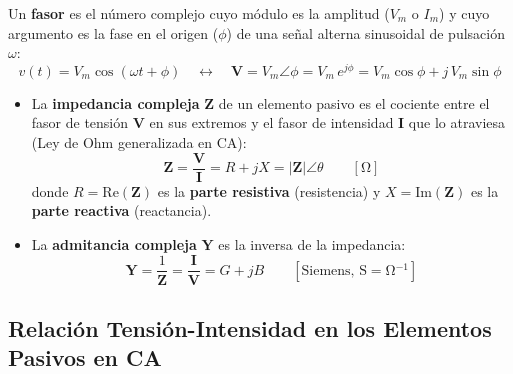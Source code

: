 Un \textbf{fasor} es el número complejo cuyo módulo es la amplitud ($V_m$ o $I_m$) y cuyo argumento es la fase en el origen ($\phi$) de una señal alterna sinusoidal de pulsación $\omega$:
\begin{equation}
    v(t) = V_m\cos(\omega t + \phi) \quad \longleftrightarrow \quad \mathbf{V} = V_m\angle\phi = V_m\,e^{j\phi} = V_m\cos\phi + j\,V_m\sin\phi
\end{equation}

\begin{definicion}
\begin{itemize}
    \item La \textbf{impedancia compleja} $\mathbf{Z}$ de un elemento pasivo es el cociente entre el fasor de tensión $\mathbf{V}$ en sus extremos y el fasor de intensidad $\mathbf{I}$ que lo atraviesa (Ley de Ohm generalizada en CA):
    \begin{equation}
        \boxed{\mathbf{Z} = \frac{\mathbf{V}}{\mathbf{I}} = R + j X = |\mathbf{Z}|\angle\theta} \qquad [\si{\ohm}]
    \end{equation}
    donde $R = \text{Re}(\mathbf{Z})$ es la \textbf{parte resistiva} (resistencia) y $X = \text{Im}(\mathbf{Z})$ es la \textbf{parte reactiva} (reactancia).
    \item La \textbf{admitancia compleja} $\mathbf{Y}$ es la inversa de la impedancia:
    \begin{equation}
        \boxed{\mathbf{Y} = \frac{1}{\mathbf{Z}} = \frac{\mathbf{I}}{\mathbf{V}} = G + j B} \qquad [\text{Siemens, }\si{\siemens} = \si{\ohm^{-1}}]
    \end{equation}
\end{itemize}
\end{definicion}

\subsection{Relación Tensión-Intensidad en los Elementos Pasivos en CA}

